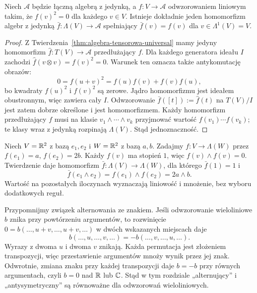 \begin{twierdzenie}
\label{thm:wedge-algebra-universal}
Niech $\mathcal A$ będzie łączną algebrą z jedynką,
a $f\colon V\to\mathcal A$ odwzorowaniem liniowym takim, że
$f(v)^2=0$ dla każdego $v\in V$. Istnieje dokładnie jeden
homomorfizm algebr z jedynką
$\bar f\colon\Lambda(V)\to\mathcal A$ spełniający
$\bar f(v)=f(v)$ dla $v\in\Lambda^1(V)=V$.
\end{twierdzenie}
\begin{proof}
Z Twierdzenia~\ref{thm:algebra-tensorowa-universal} mamy
jedyny homomorfizm $\widehat f\colon T(V)\to\mathcal A$
przedłużający $f$. Dla każdego generatora ideału $I$
zachodzi $\widehat f(v\otimes v)=f(v)^2=0$.
Warunek ten oznacza także antykomutację obrazów:
\[
 0=f(u+v)^2=f(u)f(v)+f(v)f(u),
\]
bo kwadraty $f(u)^2$ i $f(v)^2$ są zerowe.
Jądro homomorfizmu jest ideałem obustronnym, więc zawiera
cały $I$. Odwzorowanie
$\bar f([t]):=\widehat f(t)$ na $T(V)/I$ jest zatem
dobrze określone i jest homomorfizmem. Każdy homomorfizm
przedłużający $f$ musi na klasie
$v_1\wedge\cdots\wedge v_k$ przyjmować wartość
$f(v_1)\cdots f(v_k)$; te klasy wraz z jedynką rozpinają
$\Lambda(V)$. Stąd jednoznaczność.
\end{proof}

\begin{przyklad}
Niech $V=\mathbb{R}^2$ z bazą $e_1,e_2$ i $W=\mathbb{R}^2$ z bazą
$a,b$. Zadajmy $f\colon V\to\Lambda(W)$ przez
$f(e_1)=a$, $f(e_2)=2b$. Każdy $f(v)$ ma stopień $1$,
więc $f(v)\wedge f(v)=0$. Twierdzenie daje homomorfizm
$\bar f\colon\Lambda(V)\to\Lambda(W)$, dla którego
$\bar f(1)=1$ i
\[
 \bar f(e_1\wedge e_2)=f(e_1)\wedge f(e_2)=2a\wedge b.
\]
Wartość na pozostałych iloczynach wyznaczają liniowość
i mnożenie, bez wyboru dodatkowych reguł.
\end{przyklad}

Przypomnijmy związek alternowania ze znakiem. Jeśli odwzorowanie
wieloliniowe $b$ znika przy powtórzeniu argumentów, to rozwinięcie
$0=b(\ldots,u+v,\ldots,u+v,\ldots)$ w dwóch wskazanych miejscach
daje
\[
 b(\ldots,u,\ldots,v,\ldots)
 =-b(\ldots,v,\ldots,u,\ldots).
\]
Wyrazy z dwoma $u$ i dwoma $v$ znikają. Każda permutacja jest
złożeniem transpozycji, więc przestawienie argumentów mnoży wynik
przez jej znak. Odwrotnie, zmiana znaku przy każdej transpozycji
daje $b=-b$ przy równych argumentach, czyli $b=0$ nad $\mathbb{R}$ lub $\mathbb{C}$.
Stąd w tym rozdziale „alternujący” i „antysymetryczny” są równoważne
dla odwzorowań wieloliniowych.

